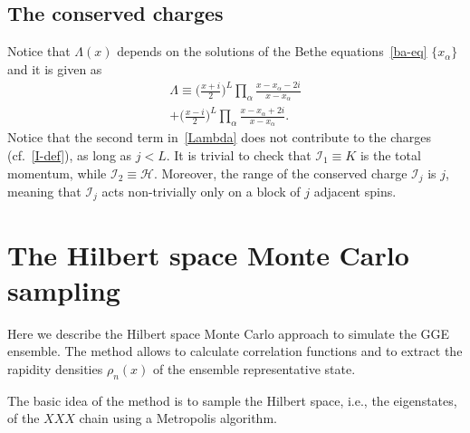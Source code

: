 \documentclass[twocolumn,superscriptaddress,prb,10pt]{revtex4-1}
\begin{document}
\subsection{The conserved charges}

Notice that $\Lambda(x)$ depends on the 
solutions of the Bethe equations~\eqref{ba-eq}  $\{x_\alpha\}$  and it is given 
as 
%
\begin{multline}
\label{Lambda}
\Lambda\equiv\Big(\frac{x+i}{2}\Big)^L\prod\limits_\alpha\frac{x-x_\alpha-2i}{x-
x_\alpha}\\+\Big(\frac{x-i}{2}\Big)^L\prod\limits_\alpha\frac{x-x_\alpha+2i}
{x-x_\alpha}. 
\end{multline}
%
Notice that the second term in~\eqref{Lambda} does not contribute to the charges 
(cf.~\eqref{I-def}), as long as $j<L$. It is trivial to check that ${\mathcal I}_1
\equiv K$ is the total momentum, while ${\mathcal I}_2\equiv {\mathcal H}$. Moreover, 
the range of the conserved charge ${\mathcal I}_j$ is $j$, meaning that ${\mathcal I}_j$ 
acts non-trivially only on a block of $j$ adjacent spins. 


\section{The Hilbert space Monte Carlo sampling}

Here we describe the Hilbert space Monte Carlo approach to simulate the GGE 
ensemble. The method allows to calculate correlation functions and to extract 
the rapidity densities $\rho_n(x)$ of the ensemble representative state. 

The basic idea of the method is to sample the Hilbert space, i.e., the eigenstates,
 of the $XXX$ chain using a Metropolis algorithm. 
\end{document}

